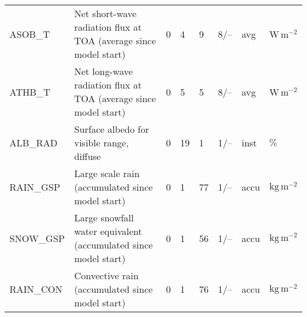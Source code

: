 \begin{longtable}{p{2.0cm}p{5.0cm}p{0.7cm}p{0.7cm}p{0.7cm}p{1.4cm}p{1cm}p{1cm}}
ASOB\_T                        &  Net short-wave radiation flux at TOA (average since model start)                      &               0                                   &                     4                       &                     9                      &                 8/--                            &                      avg                    &        $\mathrm{W\,m^{-2}}$    \\
ATHB\_T                        &  Net long-wave radiation flux at TOA (average since model start)                       &               0                                   &                     5                       &                     5                      &                 8/--                            &                      avg                    &        $\mathrm{W\,m^{-2}}$    \\ 
ALB\_RAD                       &  Surface albedo for visible range, diffuse                                             &               0                                   &                    19                       &                     1                      &                 1/--                            &                      inst                   &        $\mathrm{\%}$    \\
RAIN\_GSP                      &  Large scale rain (accumulated since model start)                                      &               0                                   &                     1                       &                    77                      &                 1/--                            &                      accu                   &        $\mathrm{kg\,m^{-2}}$    \\
SNOW\_GSP                      &  Large snowfall water equivalent (accumulated since model start)                       &               0                                   &                     1                       &                    56                      &                 1/--                            &                      accu                   &        $\mathrm{kg\,m^{-2}}$    \\
RAIN\_CON                      &  Convective rain (accumulated since model start)                                       &               0                                   &                     1                       &                    76                      &                 1/--                            &                      accu                   &        $\mathrm{kg\,m^{-2}}$    \\

\end{longtable}
